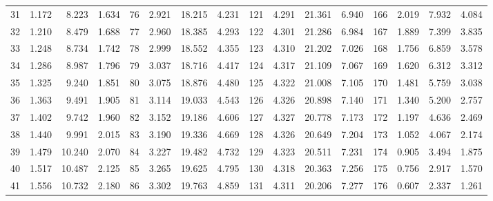\begin{table}[!h]
{\begin{tabular}{rrrr|rrrr|rrrr|rrrr}
 31 & \tiny{  1.172} &   8.223 & \tiny{  1.634} &  76 & \tiny{  2.921} &  18.215 & \tiny{  4.231} & 121 & \tiny{  4.291} &  21.361 & \tiny{  6.940} & 166 & \tiny{  2.019} &   7.932 & \tiny{  4.084}\\
 32 & \tiny{  1.210} &   8.479 & \tiny{  1.688} &  77 & \tiny{  2.960} &  18.385 & \tiny{  4.293} & 122 & \tiny{  4.301} &  21.286 & \tiny{  6.984} & 167 & \tiny{  1.889} &   7.399 & \tiny{  3.835}\\
 33 & \tiny{  1.248} &   8.734 & \tiny{  1.742} &  78 & \tiny{  2.999} &  18.552 & \tiny{  4.355} & 123 & \tiny{  4.310} &  21.202 & \tiny{  7.026} & 168 & \tiny{  1.756} &   6.859 & \tiny{  3.578}\\
 34 & \tiny{  1.286} &   8.987 & \tiny{  1.796} &  79 & \tiny{  3.037} &  18.716 & \tiny{  4.417} & 124 & \tiny{  4.317} &  21.109 & \tiny{  7.067} & 169 & \tiny{  1.620} &   6.312 & \tiny{  3.312}\\
 35 & \tiny{  1.325} &   9.240 & \tiny{  1.851} &  80 & \tiny{  3.075} &  18.876 & \tiny{  4.480} & 125 & \tiny{  4.322} &  21.008 & \tiny{  7.105} & 170 & \tiny{  1.481} &   5.759 & \tiny{  3.038}\\
 36 & \tiny{  1.363} &   9.491 & \tiny{  1.905} &  81 & \tiny{  3.114} &  19.033 & \tiny{  4.543} & 126 & \tiny{  4.326} &  20.898 & \tiny{  7.140} & 171 & \tiny{  1.340} &   5.200 & \tiny{  2.757}\\
 37 & \tiny{  1.402} &   9.742 & \tiny{  1.960} &  82 & \tiny{  3.152} &  19.186 & \tiny{  4.606} & 127 & \tiny{  4.327} &  20.778 & \tiny{  7.173} & 172 & \tiny{  1.197} &   4.636 & \tiny{  2.469}\\
 38 & \tiny{  1.440} &   9.991 & \tiny{  2.015} &  83 & \tiny{  3.190} &  19.336 & \tiny{  4.669} & 128 & \tiny{  4.326} &  20.649 & \tiny{  7.204} & 173 & \tiny{  1.052} &   4.067 & \tiny{  2.174}\\
 39 & \tiny{  1.479} &  10.240 & \tiny{  2.070} &  84 & \tiny{  3.227} &  19.482 & \tiny{  4.732} & 129 & \tiny{  4.323} &  20.511 & \tiny{  7.231} & 174 & \tiny{  0.905} &   3.494 & \tiny{  1.875}\\
 40 & \tiny{  1.517} &  10.487 & \tiny{  2.125} &  85 & \tiny{  3.265} &  19.625 & \tiny{  4.795} & 130 & \tiny{  4.318} &  20.363 & \tiny{  7.256} & 175 & \tiny{  0.756} &   2.917 & \tiny{  1.570}\\
 41 & \tiny{  1.556} &  10.732 & \tiny{  2.180} &  86 & \tiny{  3.302} &  19.763 & \tiny{  4.859} & 131 & \tiny{  4.311} &  20.206 & \tiny{  7.277} & 176 & \tiny{  0.607} &   2.337 & \tiny{  1.261}\\

\end{tabular}}
\end{table}
